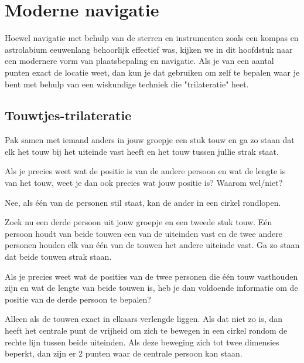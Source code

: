 \chapter{Moderne navigatie}

Hoewel navigatie met behulp van de sterren en instrumenten zoals een kompas en astrolabium eeuwenlang behoorlijk effectief was, kijken we in dit hoofdstuk naar een modernere vorm van plaatsbepaling en navigatie. Als je van een aantal punten exact de locatie weet, dan kun je dat gebruiken om zelf te bepalen waar je bent met behulp van een wiskundige techniek die "trilateratie" heet.

\section{Touwtjes-trilateratie}

\begin{opgave}
	Pak samen met iemand anders in jouw groepje een stuk touw en ga zo staan dat elk het touw bij het uiteinde vast heeft en het touw tussen jullie strak staat.

	Als je precies weet wat de positie is van de andere persoon en wat de lengte is van het touw, weet je dan ook precies wat jouw positie is? Waarom wel/niet?
	\begin{antwoord}
		Nee, als \'e\'en van de personen stil staat, kan de ander in een cirkel rondlopen.
	\end{antwoord}
\end{opgave}

\begin{opgave}
	Zoek nu een derde persoon uit jouw groepje en een tweede stuk touw. E\'en persoon houdt van beide touwen een van de uiteinden vast en de twee andere personen houden elk van \'e\'en van de touwen het andere uiteinde vast. Ga zo staan dat beide touwen strak staan.

	Als je precies weet wat de posities van de twee personen die \'e\'en touw vasthouden zijn en wat de lengte van beide touwen is, heb je dan voldoende informatie om de positie van de derde persoon te bepalen?
	\begin{antwoord}
		Alleen als de touwen exact in elkaars verlengde liggen. Als dat niet zo is, dan heeft het centrale punt de vrijheid om zich te bewegen in een cirkel rondom de rechte lijn tussen beide uiteinden. Als deze beweging zich tot twee dimensies beperkt, dan zijn er 2 punten waar de centrale persoon kan staan.
	\end{antwoord}
\end{opgave}

